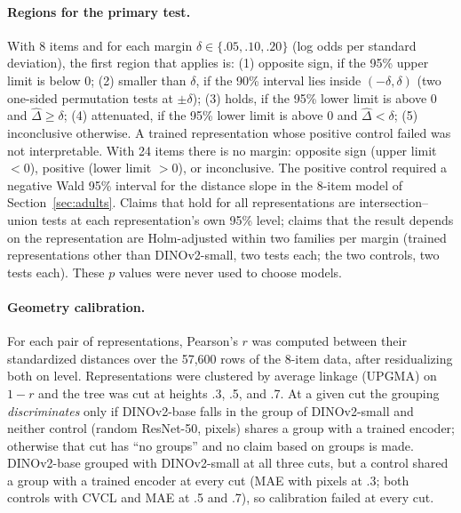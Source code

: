 \paragraph{Regions for the primary test.} With 8 items and for each margin $\delta \in \{.05, .10, .20\}$ (log odds per standard deviation), the first region that applies is: (1) opposite sign, if the 95\% upper limit is below 0; (2) smaller than $\delta$, if the 90\% interval lies inside $(-\delta, \delta)$ (two one-sided permutation tests at $\pm\delta$); (3) holds, if the 95\% lower limit is above 0 and $\hat\Delta \geq \delta$; (4) attenuated, if the 95\% lower limit is above 0 and $\hat\Delta < \delta$; (5) inconclusive otherwise. A trained representation whose positive control failed was not interpretable. With 24 items there is no margin: opposite sign (upper limit $< 0$), positive (lower limit $> 0$), or inconclusive. The positive control required a negative Wald 95\% interval for the distance slope in the 8-item model of Section~\ref{sec:adults}. Claims that hold for all representations are intersection--union tests at each representation's own 95\% level; claims that the result depends on the representation are Holm-adjusted within two families per margin (trained representations other than DINOv2-small, two tests each; the two controls, two tests each). These $p$ values were never used to choose models.

\paragraph{Geometry calibration.} For each pair of representations, Pearson's $r$ was computed between their standardized distances over the 57{,}600 rows of the 8-item data, after residualizing both on level. Representations were clustered by average linkage (UPGMA) on $1 - r$ and the tree was cut at heights .3, .5, and .7. At a given cut the grouping \emph{discriminates} only if DINOv2-base falls in the group of DINOv2-small and neither control (random ResNet-50, pixels) shares a group with a trained encoder; otherwise that cut has ``no groups'' and no claim based on groups is made. DINOv2-base grouped with DINOv2-small at all three cuts, but a control shared a group with a trained encoder at every cut (MAE with pixels at .3; both controls with CVCL and MAE at .5 and .7), so calibration failed at every cut.

